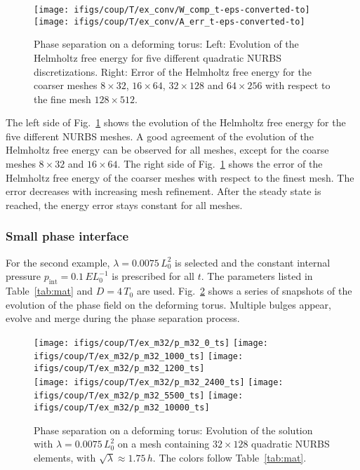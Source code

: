 \documentclass[11pt]{article}
\begin{document}
\begin{figure}[H]
\centering
\texttt{[image: ifigs/coup/T/ex\_conv/W\_comp\_t-eps-converted-to]}
\texttt{[image: ifigs/coup/T/ex\_conv/A\_err\_t-eps-converted-to]}
\caption{Phase separation on a deforming torus: Left: Evolution of the Helmholtz free energy for five different quadratic NURBS discretizations. Right: Error of the Helmholtz free energy for the coarser meshes $8\times 32$, $16\times 64$, $32\times 128$ and $64\times 256$ with respect to the fine mesh $128\times 512$.}
\label{fig:t_ena1}
\end{figure}
The left side of Fig.~\ref{fig:t_ena1} shows the evolution of the Helmholtz free energy for the five different NURBS meshes. 
A good agreement of the evolution of the Helmholtz free energy can be observed for all meshes, except for the coarse meshes $8\times 32$ and $16\times 64$. 
The right side of Fig.~\ref{fig:t_ena1} shows the error of the Helmholtz free energy of the coarser meshes with respect to the finest mesh. 
The error decreases with increasing mesh refinement.
After the steady state is reached, the energy error stays constant for all meshes. 

\subsubsection{Small phase interface}
\label{Sec:ex2}

For the second example, $\lambda = 0.0075\,L_0^2$ is selected and the constant internal pressure $p_{\mathrm{int}}=0.1\,EL_0^{-1}$ is prescribed for all $t$. 
The parameters listed in Table~\ref{tab:mat} and $D=4\,T_0$ are used. 
Fig.~\ref{fig:t_evo2} shows a series of snapshots of the evolution of the phase field on the deforming torus. 
Multiple bulges appear, evolve and merge during the phase separation process. 
\begin{figure}[H]
\centering
\texttt{[image: ifigs/coup/T/ex\_m32/p\_m32\_0\_ts]}
\texttt{[image: ifigs/coup/T/ex\_m32/p\_m32\_1000\_ts]}
\texttt{[image: ifigs/coup/T/ex\_m32/p\_m32\_1200\_ts]}\\
\texttt{[image: ifigs/coup/T/ex\_m32/p\_m32\_2400\_ts]}
\texttt{[image: ifigs/coup/T/ex\_m32/p\_m32\_5500\_ts]}
\texttt{[image: ifigs/coup/T/ex\_m32/p\_m32\_10000\_ts]}
\caption{Phase separation on a deforming torus: Evolution of the solution with $\lambda=0.0075\,L_0^2$ on a mesh containing $32 \times 128$ quadratic NURBS elements, with $\sqrt{\lambda}\approx 1.75\,h$. The colors follow Table~\ref{tab:mat}.}
\label{fig:t_evo2}
\end{figure}
\end{document}
